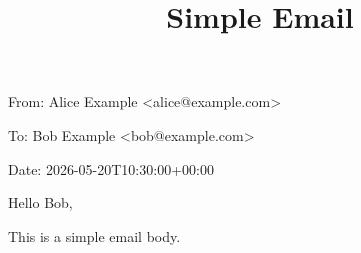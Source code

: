 \documentclass[11pt,a4paper]{article}
\title{Simple Email}
\begin{document}
\maketitle

From: Alice Example <alice@example.com>

To: Bob Example <bob@example.com>

Date: 2026-05-20T10:30:00+00:00

Hello Bob,

This is a simple email body.
\end{document}
